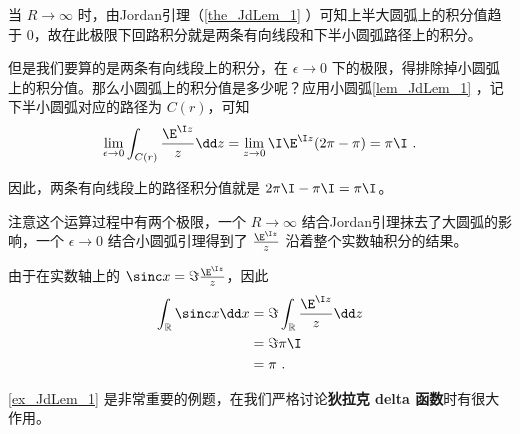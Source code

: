 \begin{example}{}
当 $R\to \infty$ 时，由Jordan引理（\autoref{the_JdLem_1} ）可知上半大圆弧上的积分值趋于 $0$，故在此极限下回路积分就是两条有向线段和下半小圆弧路径上的积分。

但是我们要算的是两条有向线段上的积分，在 $\epsilon\to 0$ 下的极限，得排除掉小圆弧上的积分值。那么小圆弧上的积分值是多少呢？应用小圆弧\autoref{lem_JdLem_1} ，记下半小圆弧对应的路径为 $C(r)$，可知
\begin{equation}
\lim_{\epsilon\to 0}\int_{C(r)}\frac{\E^{\I z}}{z}\dd z=\lim_{z\to 0}\I\E^{\I z}(2\pi-\pi)=\pi\I~.
\end{equation}

因此，两条有向线段上的路径积分值就是 $2\pi\I-\pi\I=\pi\I$。

注意这个运算过程中有两个极限，一个 $R\to\infty$ 结合Jordan引理抹去了大圆弧的影响，一个 $\epsilon\to 0$ 结合小圆弧引理得到了 $\frac{\E^{\I z}}{z}$ 沿着整个实数轴积分的结果。

由于在实数轴上的 $\sinc x=\Im \frac{\E^{\I z}}{z}$，因此
\begin{equation}
\begin{aligned}
\int_{\mathbb{R}}\sinc x \dd x&=\Im \int_{\mathbb{R}}\frac{\E^{\I z}}{z}\dd z\\
&=\Im \pi\I\\
&=\pi~.
\end{aligned}
\end{equation}



\end{example}

\autoref{ex_JdLem_1} 是非常重要的例题，在我们严格讨论\textbf{狄拉克 delta 函数}时有很大作用。

